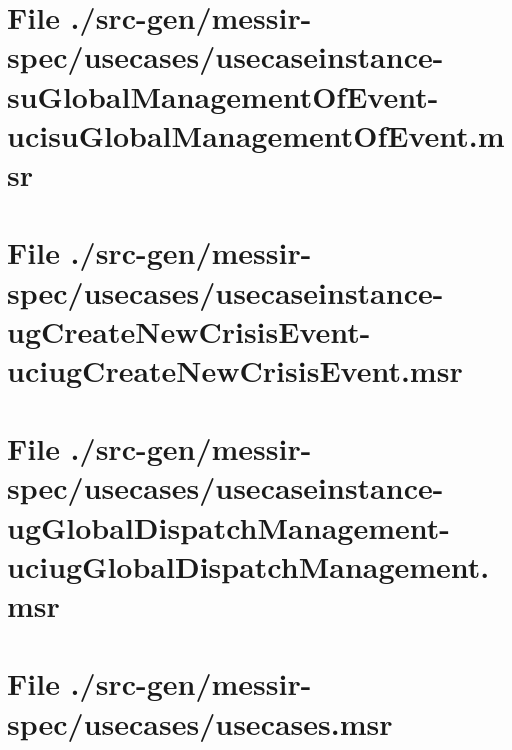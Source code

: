\section[File /.../usecaseinstance-suGlobalManagementOfEvent-ucisuGlobalManagementOfEvent.msr]{File ./src-gen/messir-spec/usecases/usecaseinstance-suGlobalManagementOfEvent-ucisuGlobalManagementOfEvent.msr}
\scriptsize

\normalsize
	
\section[File /.../usecaseinstance-ugCreateNewCrisisEvent-uciugCreateNewCrisisEvent.msr]{File ./src-gen/messir-spec/usecases/usecaseinstance-ugCreateNewCrisisEvent-uciugCreateNewCrisisEvent.msr}
\scriptsize

\normalsize
	
\section[File /.../usecaseinstance-ugGlobalDispatchManagement-uciugGlobalDispatchManagement.msr]{File ./src-gen/messir-spec/usecases/usecaseinstance-ugGlobalDispatchManagement-uciugGlobalDispatchManagement.msr}
\scriptsize

\normalsize
	
\section[File /src-gen/messir-spec/usecases/usecases.msr]{File ./src-gen/messir-spec/usecases/usecases.msr}
\scriptsize

\normalsize
	
